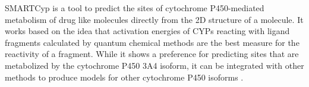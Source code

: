 SMARTCyp is a tool to predict the sites of cytochrome P450-mediated metabolism of drug like molecules directly from the 2D structure of a molecule. It works based on the idea that activation energies of CYPs reacting with ligand fragments calculated by quantum chemical methods are the best measure for the reactivity of a fragment. While it shows a preference for predicting sites that are metabolized by the cytochrome P450 3A4 isoform, it can be integrated with other methods to produce models for other cytochrome P450 isoforms \cite{Rydberg_2010}.